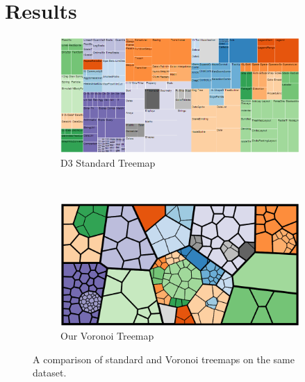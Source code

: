 \documentclass{acm_proc_article-sp} \usepackage{cite}
\begin{document}
\section{Results}
\label{sec:results}


\begin{figure}
        \centering
        \begin{subfigure}[b]{0.45\textwidth}
                \includegraphics[width=\textwidth]{source images/d3-treemap-flare.png}
                \caption{D3 Standard Treemap}
                \label{fig:treemapflare}
        \end{subfigure}%
        ~ %
	\qquad
        \begin{subfigure}[b]{0.45\textwidth}
                \includegraphics[width=\textwidth]{source images/voronoi-flare-960-500-cropped.png}
                \caption{Our Voronoi Treemap}
                \label{fig:voronoiflare}
        \end{subfigure}
        \caption{A comparison of standard and Voronoi treemaps on the same dataset.}\label{fig:comparestandard}
\end{figure}
\end{document}
